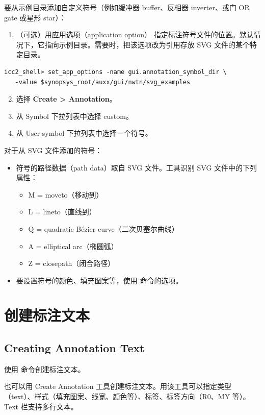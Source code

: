 要从示例目录添加自定义符号（例如缓冲器 buffer、反相器 inverter、或门 OR gate 或星形 star）：
\begin{enumerate}
  \item （可选）用应用选项（application option） 指定标注符号文件的位置。默认情况下，它指向示例目录。需要时，把该选项改为引用存放 SVG 文件的某个特定目录。
\end{enumerate}
\begin{lstlisting}
icc2_shell> set_app_options -name gui.annotation_symbol_dir \
   -value $synopsys_root/auxx/gui/nwtn/svg_examples
\end{lstlisting}
\begin{enumerate}
  \setcounter{enumi}{1}
  \item 选择 \textbf{Create > Annotation}。
  \item 从 Symbol 下拉列表中选择 custom。
  \item 从 User symbol 下拉列表中选择一个符号。
\end{enumerate}

对于从 SVG 文件添加的符号：
\begin{itemize}
  \item 符号的路径数据（path data）取自 SVG 文件。工具识别 SVG 文件中的下列属性：
  \begin{itemize}
    \item M = moveto（移动到）
    \item L = lineto（直线到）
    \item Q = quadratic Bézier curve（二次贝塞尔曲线）
    \item A = elliptical arc（椭圆弧）
    \item Z = closepath（闭合路径）
  \end{itemize}
  \item 要设置符号的颜色、填充图案等，使用  命令的选项。
\end{itemize}

\section{创建标注文本}
\subsection*{Creating Annotation Text}

使用  命令创建标注文本。

也可以用 Create Annotation 工具创建标注文本。用该工具可以指定类型（text）、样式（填充图案、线宽、颜色等）、标签、标签方向（R0、MY 等）。Text 栏支持多行文本。

